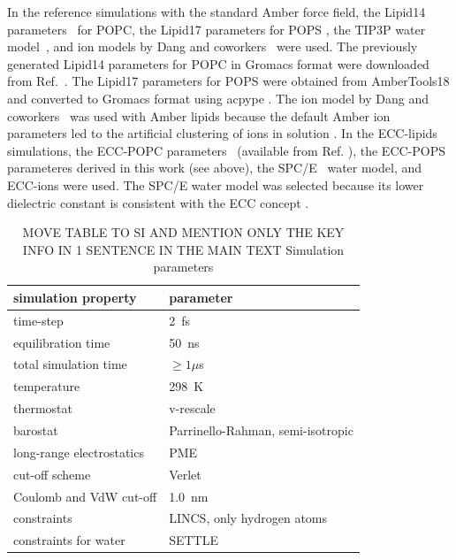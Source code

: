 \documentclass[journal=jpcbfk,manuscript=article]{achemso}
\begin{document}
In the reference simulations with the standard Amber force field,
the Lipid14 parameters~\cite{dickson14} for POPC, the Lipid17 parameters for POPS \cite{lipid17-future},
the TIP3P water model~\cite{jorgensen83}, and ion models by Dang and coworkers~\cite{smith94,chang1999,dang2006} were used.
The previously generated \cite{botan15} Lipid14 parameters for POPC in Gromacs format were downloaded from Ref.~. 
The Lipid17 parameters for POPS were obtained from AmberTools18 \cite{amber18} 
and converted to Gromacs format using acpype \cite{acpype}.  
The ion model by Dang and coworkers~\cite{smith94,chang1999,dang2006} was used with Amber lipids because
the default Amber ion parameters \cite{aqvist90} led to the artificial clustering of ions in solution \cite{NMRlipidsIV}.
In the ECC-lipids simulations,
the ECC-POPC parameters~\cite{melcr18} (available from Ref. ), 
the ECC-POPS parameteres derived in this work (see above), 
the SPC/E~\cite{Berendsen1987} water model, and ECC-ions \cite{martinek17, kohagen16, Pluharova2014} were used.
The SPC/E water model was selected because its lower dielectric constant is consistent with the
ECC concept \cite{leontyev11,leontyev14}.
\begin{table}[tbp]
  \caption{MOVE TABLE TO SI AND MENTION ONLY THE KEY INFO IN 1 SENTENCE IN THE MAIN TEXT
Simulation parameters}
  \label{tbl:mdpar}
  \begin{tabular}{ll}
    simulation property & parameter   \\
    \hline
    time-step           & 2~fs         \\
    equilibration time  & 50~ns  \\
    total simulation time     & $\geq 1 \mu$s  \\
    temperature         & 298~K       \\
    thermostat          & v-rescale  \cite{bussi07}   \\
    barostat            & Parrinello-Rahman, semi-isotropic \cite{parrinello81} \\
    long-range electrostatics & PME  \cite{darden93}  \\
    cut-off scheme      & Verlet \cite{Pall13}      \\
    Coulomb and VdW cut-off & 1.0~nm \\
    constraints         & LINCS, only hydrogen atoms \cite{hess97} \\
    constraints for water & SETTLE  \cite{miyamoto92} \\
    \hline
  \end{tabular}
\end{table}
 
\end{document}
